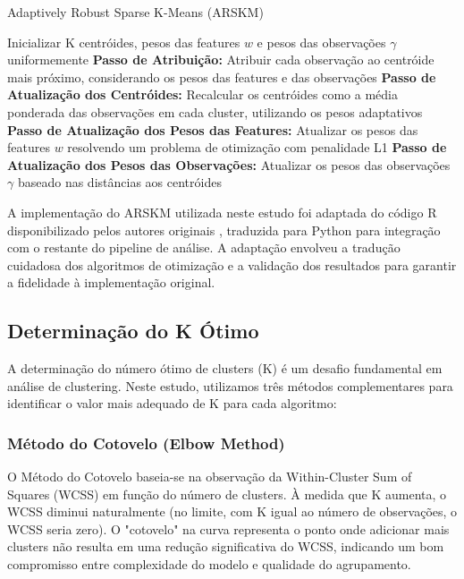 \documentclass[conference]{IEEEtran}
\begin{document}
\begin{algorithm}
\caption{Adaptively Robust Sparse K-Means (ARSKM)}
\begin{algorithmic}[1]
\STATE Inicializar K centróides, pesos das features $w$ e pesos das observações $\gamma$ uniformemente
\REPEAT
\STATE \textbf{Passo de Atribuição:} Atribuir cada observação ao centróide mais próximo, considerando os pesos das features e das observações
\STATE \textbf{Passo de Atualização dos Centróides:} Recalcular os centróides como a média ponderada das observações em cada cluster, utilizando os pesos adaptativos
\STATE \textbf{Passo de Atualização dos Pesos das Features:} Atualizar os pesos das features $w$ resolvendo um problema de otimização com penalidade L1
\STATE \textbf{Passo de Atualização dos Pesos das Observações:} Atualizar os pesos das observações $\gamma$ baseado nas distâncias aos centróides
\end{algorithmic}
\end{algorithm}

A implementação do ARSKM utilizada neste estudo foi adaptada do código R disponibilizado pelos autores originais \cite{lee2020arsk}, traduzida para Python para integração com o restante do pipeline de análise. A adaptação envolveu a tradução cuidadosa dos algoritmos de otimização e a validação dos resultados para garantir a fidelidade à implementação original.

\subsection{Determinação do K Ótimo}
A determinação do número ótimo de clusters (K) é um desafio fundamental em análise de clustering. Neste estudo, utilizamos três métodos complementares para identificar o valor mais adequado de K para cada algoritmo:

\subsubsection{Método do Cotovelo (Elbow Method)}
O Método do Cotovelo baseia-se na observação da Within-Cluster Sum of Squares (WCSS) em função do número de clusters. À medida que K aumenta, o WCSS diminui naturalmente (no limite, com K igual ao número de observações, o WCSS seria zero). O "cotovelo" na curva representa o ponto onde adicionar mais clusters não resulta em uma redução significativa do WCSS, indicando um bom compromisso entre complexidade do modelo e qualidade do agrupamento.
\end{document}
